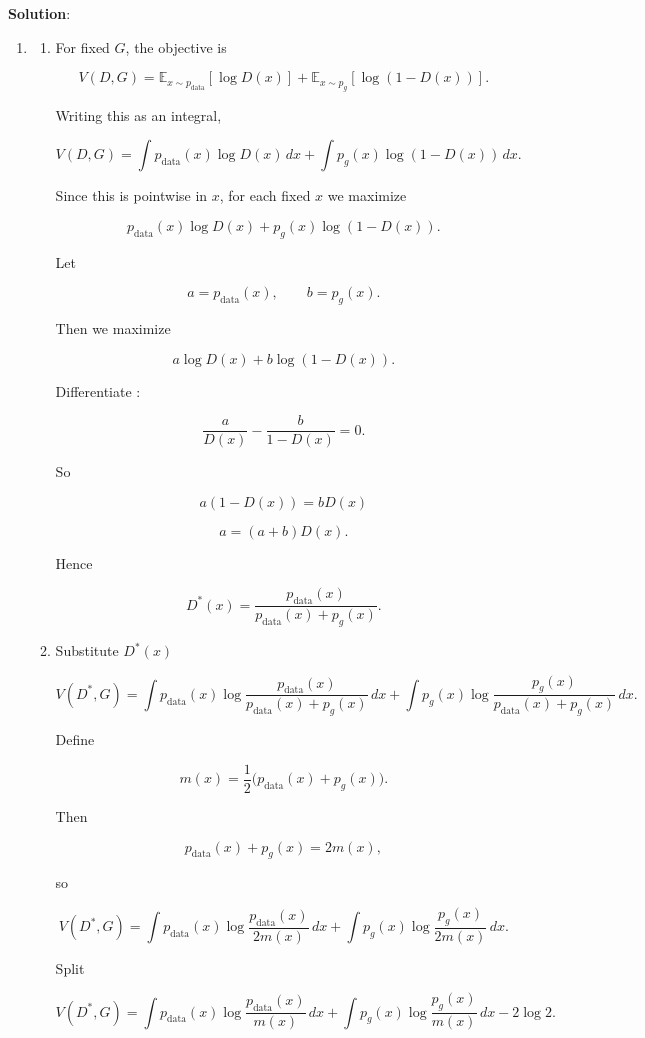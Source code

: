 \documentclass[submit]{harvardml}
\newenvironment{solution}{%
    \vspace{2mm}\color{blue}\noindent\textbf{Solution}:\ }
{}
\begin{document}
\begin{solution}
	\begin{enumerate}
	    \item \begin{enumerate}
	        \item For fixed \(G\), the objective is

\[
V(D,G)
=
\mathbb{E}_{x \sim p_{\mathrm{data}}}[\log D(x)]
+
\mathbb{E}_{x \sim p_g}[\log(1-D(x))].
\]

Writing this as an integral,

\[
V(D,G)
=
\int p_{\mathrm{data}}(x)\log D(x)\,dx
+
\int p_g(x)\log(1-D(x))\,dx.
\]

Since this is pointwise in \(x\), for each fixed \(x\) we maximize

\[
p_{\mathrm{data}}(x)\log D(x) + p_g(x)\log(1-D(x)).
\]

Let

\[
a = p_{\mathrm{data}}(x), \qquad b = p_g(x).
\]

Then we maximize

\[
a \log D(x) + b \log(1-D(x)).
\]

Differentiate :

\[
\frac{a}{D(x)} - \frac{b}{1-D(x)} = 0.
\]

So

\[
a(1-D(x)) = bD(x)
\]

\[
a = (a+b)D(x).
\]

Hence

\[
\boxed{
D^*(x)=\frac{p_{\mathrm{data}}(x)}{p_{\mathrm{data}}(x)+p_g(x)}
}.
\]
            \item Substitute \(D^*(x)\) 

\[
V(D^*,G)
=
\int p_{\mathrm{data}}(x)\log \frac{p_{\mathrm{data}}(x)}{p_{\mathrm{data}}(x)+p_g(x)}\,dx
+
\int p_g(x)\log \frac{p_g(x)}{p_{\mathrm{data}}(x)+p_g(x)}\,dx.
\]

Define

\[
m(x)=\frac{1}{2}\bigl(p_{\mathrm{data}}(x)+p_g(x)\bigr).
\]

Then

\[
p_{\mathrm{data}}(x)+p_g(x)=2m(x),
\]

so

\[
V(D^*,G)
=
\int p_{\mathrm{data}}(x)\log \frac{p_{\mathrm{data}}(x)}{2m(x)}\,dx
+
\int p_g(x)\log \frac{p_g(x)}{2m(x)}\,dx.
\]

Split

\[
V(D^*,G)
=
\int p_{\mathrm{data}}(x)\log \frac{p_{\mathrm{data}}(x)}{m(x)}\,dx
+
\int p_g(x)\log \frac{p_g(x)}{m(x)}\,dx
-2\log 2.
\]


\end{enumerate}
\end{enumerate}
\end{solution}
\end{document}

